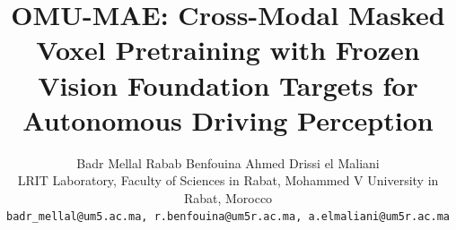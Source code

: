 \documentclass[10pt,twocolumn,letterpaper]{article}
\newif\ifanon \anonfalse
\begin{document}
\title{OMU-MAE: Cross-Modal Masked Voxel Pretraining with
Frozen Vision Foundation Targets for Autonomous Driving Perception}

\ifanon
  \author{}      %
\else
  \author{Badr Mellal \quad Rabab Benfouina \quad Ahmed Drissi el Maliani\\
  LRIT Laboratory, Faculty of Sciences in Rabat, Mohammed V University in Rabat, Morocco\\
  {\tt\small badr\_mellal@um5.ac.ma, r.benfouina@um5r.ac.ma, a.elmaliani@um5r.ac.ma}}
\fi

\maketitle

\begin{abstract}

\end{abstract}










{\small


}
\end{document}
